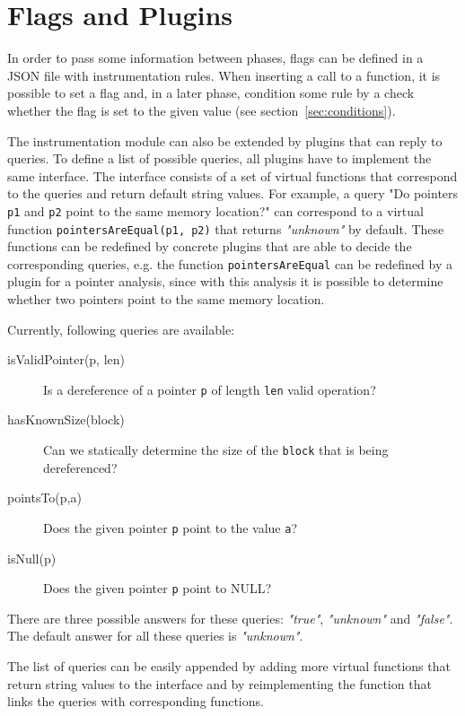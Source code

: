 \section{Flags and Plugins}

In order to pass some information between phases, flags can be defined in a
JSON file with instrumentation rules. When inserting a call to a function, it
is possible to set a flag and, in a later phase, condition some rule by a check
whether the flag is set to the given value (see section~\ref{sec:conditions}).

The instrumentation module can also be extended by plugins that can reply to
queries. To define a list of possible queries, all plugins have to implement
the same interface. The interface consists of a set of virtual functions that
correspond to the queries and return default string values. For example, a
query "Do pointers \texttt{p1} and \texttt{p2} point to the same memory
location?" can correspond to a virtual function \texttt{pointersAreEqual(p1,
p2)} that returns \emph{"unknown"} by default. These functions can be redefined
by concrete plugins that are able to decide the corresponding queries, e.g.
the function \texttt{pointersAreEqual} can be redefined by a plugin for a
pointer analysis, since with this analysis it is possible to determine whether
two pointers point to the same memory location.

Currently, following queries are available:
\begin{description}
  \item[isValidPointer(p, len)] Is a dereference of a pointer \texttt{p} of
  length \texttt{len} valid operation?
  \item[hasKnownSize(block)] Can we statically determine the size of the
  \texttt{block} that is being dereferenced?
  \item[pointsTo(p,a)] Does the given pointer \texttt{p} point to the value \texttt{a}?
  \item[isNull(p)] Does the given pointer \texttt{p} point to NULL?
\end{description}
There are three possible answers for these queries:
\emph{"true"}, \emph{"unknown"} and \emph{"false"}. The default answer for all
these queries is \emph{"unknown"}.

The list of queries can be easily appended by adding more virtual functions
that return string values to the interface and by reimplementing the function
that links the queries with corresponding functions.

